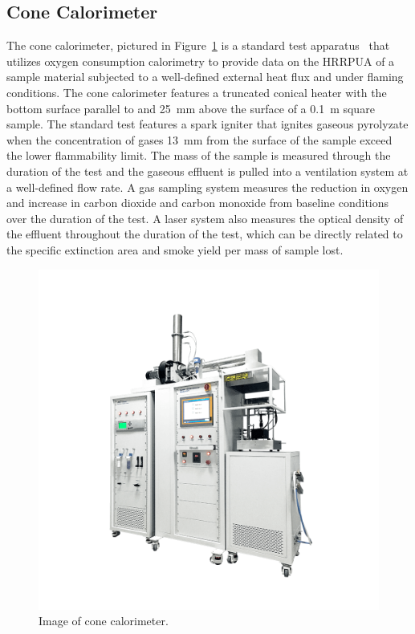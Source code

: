 \documentclass[12pt,oneside]{book}
\begin{document}
\subsection{Cone Calorimeter}
\label{sec:cone_calorimeter}

The cone calorimeter, pictured in Figure~\ref{fig:cone} is a standard test apparatus~\cite{ASTM_E1354} that utilizes oxygen consumption calorimetry to provide data on the HRRPUA of a sample material subjected to a well-defined external heat flux and under flaming conditions. The cone calorimeter features a truncated conical heater with the bottom surface parallel to and 25~mm above the surface of a 0.1~m square sample. The standard test features a spark igniter that ignites gaseous pyrolyzate when the concentration of gases 13~mm from the surface of the sample exceed the lower flammability limit. The mass of the sample is measured through the duration of the test and the gaseous effluent is pulled into a ventilation system at a well-defined flow rate. A gas sampling system measures the reduction in oxygen and increase in carbon dioxide and carbon monoxide from baseline conditions over the duration of the test. A laser system also measures the optical density of the effluent throughout the duration of the test, which can be directly related to the specific extinction area and smoke yield per mass of sample lost.

\begin{figure}[!ht]
\centering
\includegraphics[width=.75\columnwidth]{Figures/Cone.png}
\caption[Image of Cone Calorimeter]{Image of cone calorimeter.}
\label{fig:cone}
\end{figure}
\end{document}

